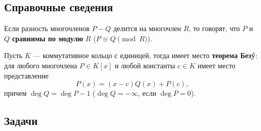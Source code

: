 \subsection*{Справочные сведения}

Если разность многочленов $P-Q$ делится на многочлен $R$, то говорят, что $P$ и $Q$ \textbf{сравнимы по модулю} $R$ ($P\equiv Q\pmod R$).

Пусть $K$ --- коммутативное кольцо с единицей, тогда имеет место \textbf{теорема Без\'y}:
для любого многочлена $P\in K[x]$ и любой константы $c\in K$ имеет место представление
$$
P(x)=(x-c)Q(x)+P(c),
$$
причем $\deg Q=\deg P-1$ ($\deg Q=-\infty$, если $\deg P=0$).


\subsection*{Задачи}

